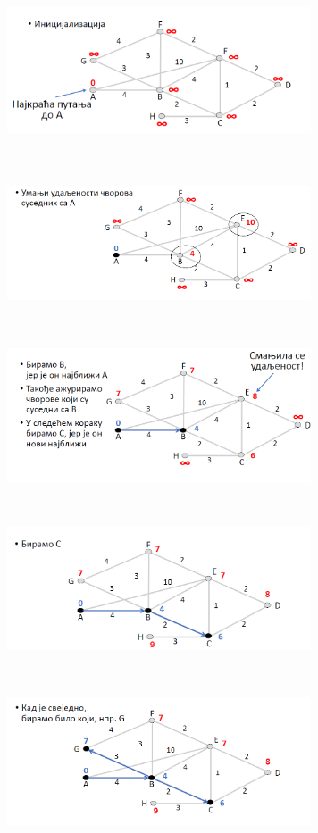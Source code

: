 \documentclass{article} %
\begin{document}
\begin{center}
		\includegraphics[width=9cm, height=5cm]{da1}\\
		\includegraphics[width=9cm, height=5cm]{da2}\\
		\includegraphics[width=9cm, height=5cm]{da3}\\
		\includegraphics[width=9cm, height=5cm]{da4}\\
		\includegraphics[width=9cm, height=5cm]{da5}\\

\end{center}
\end{document}
